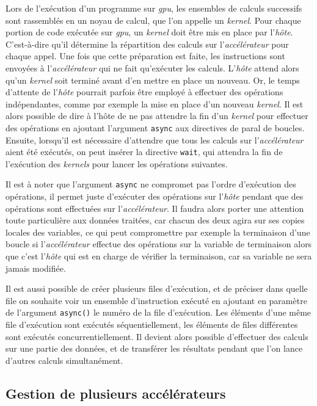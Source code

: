 \documentclass{article}
\begin{document}
Lors de l'exécution d'un programme sur \textit{\gls{gpu}}, les ensembles de calculs successifs sont rassemblés en un noyau de calcul, que l'on appelle un \textit{kernel}. Pour chaque portion de code exécutée sur \textit{\gls{gpu}}, un \textit{kernel} doit être mis en place par l'\textit{hôte}. C'est-à-dire qu'il détermine la répartition des calculs sur l'\textit{accélérateur} pour chaque appel. Une fois que cette préparation est faite, les instructions sont envoyées à l'\textit{accélérateur} qui ne fait qu'exécuter les calculs. L'\textit{hôte} attend alors qu'un \textit{kernel} soit terminé avant d'en mettre en place un nouveau. Or, le temps d'attente de l'\textit{hôte} pourrait parfois être employé à effectuer des opérations indépendantes, comme par exemple la mise en place d'un nouveau \textit{kernel}. Il est alors possible de dire à l'hôte de ne pas attendre la fin d'un \textit{kernel} pour effectuer des opérations en ajoutant l'argument \texttt{async} aux directives de \gls{paral} de boucles. Ensuite, lorsqu'il est nécessaire d'attendre que tous les calculs sur l'\textit{accélérateur} aient été exécutés, on peut insérer la directive \texttt{wait}, qui attendra la fin de l'exécution des \textit{kernels} pour lancer les opérations suivantes.

Il est à noter que l'argument \texttt{async} ne compromet pas l'ordre d'exécution des opérations, il permet juste d'exécuter des opérations sur l'\textit{hôte} pendant que des opérations sont effectuées sur l'\textit{accélérateur}. Il faudra alors porter une attention toute particulière aux données traitées, car chacun des deux agira sur ses copies locales des variables, ce qui peut compromettre par exemple la terminaison d'une boucle si l'\textit{accélérateur} effectue des opérations sur la variable de terminaison alors que c'est l'\textit{hôte} qui est en charge de vérifier la terminaison, car sa variable ne sera jamais modifiée.

Il est aussi possible de créer plusieurs files d'exécution, et de préciser dans quelle file on souhaite voir un ensemble d'instruction exécuté en ajoutant en paramètre de l'argument \texttt{async()} le numéro de la file d'exécution. Les éléments d'une même file d'exécution sont exécutés séquentiellement, les éléments de files différentes sont exécutés concurrentiellement. Il devient alors possible d'effectuer des calculs sur une partie des données, et de transférer les résultats pendant que l'on lance d'autres calculs simultanément.  


\subsection{Gestion de plusieurs accélérateurs}
\end{document}
